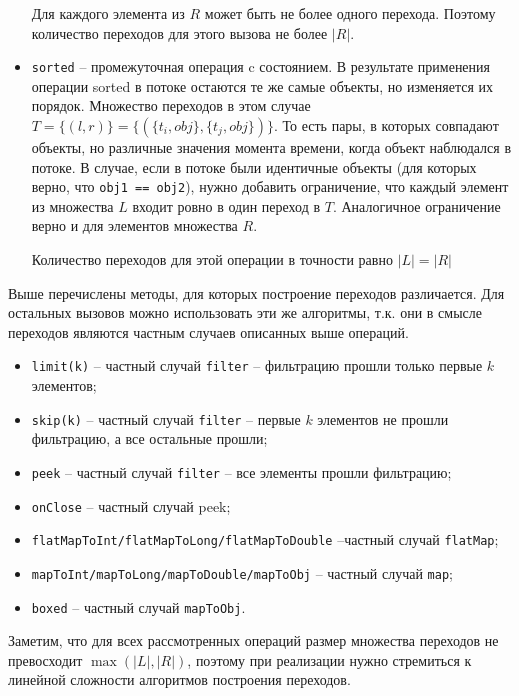 \begin{itemize}
	Для каждого элемента из $R$ может быть не более одного перехода. Поэтому количество переходов для этого вызова не более $|R|$.
	\item \texttt{sorted} -- промежуточная операция c состоянием. В результате применения операции sorted в потоке остаются те же самые объекты, но изменяется их порядок. Множество переходов в этом случае $T = \{(l, r)\} = \{(\{t_i, obj\}, \{t_j, obj\})\}$. То есть пары, в которых совпадают объекты, но различные значения момента времени, когда объект наблюдался в потоке. В случае, если в потоке были идентичные объекты (для которых верно, что \texttt{obj1 == obj2}), нужно добавить ограничение, что каждый элемент из множества $L$ входит ровно в один переход в $T$. Аналогичное ограничение верно и для элементов множества $R$.
	
	Количество переходов для этой операции в точности равно $|L| = |R|$
\end{itemize}

Выше перечислены методы, для которых построение переходов различается. Для остальных вызовов можно использовать эти же алгоритмы, т.к. они в смысле переходов являются частным случаев описанных выше операций.
\begin{itemize}
	\item \texttt{limit(k)} -- частный случай \texttt{filter} -- фильтрацию прошли только первые $k$ элементов;
	\item \texttt{skip(k)} -- частный случай \texttt{filter} -- первые $k$ элементов не прошли фильтрацию, а все остальные прошли;
	\item \texttt{peek} -- частный случай \texttt{filter} -- все элементы прошли фильтрацию;
	\item \texttt{onClose} -- частный случай peek;
	\item \texttt{flatMapToInt/flatMapToLong/flatMapToDouble} --частный случай \texttt{flatMap};
	\item \texttt{mapToInt/mapToLong/mapToDouble/mapToObj} -- частный случай \texttt{map};
	\item \texttt{boxed} -- частный случай \texttt{mapToObj}.
\end{itemize}  

Заметим, что для всех рассмотренных операций размер множества переходов не превосходит $\max(|L|, |R|)$, поэтому при реализации нужно стремиться к линейной сложности алгоритмов построения переходов.

